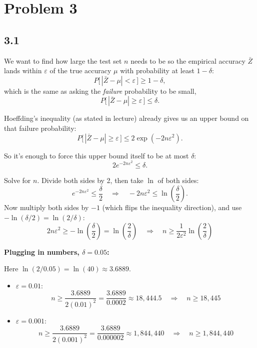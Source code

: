 \documentclass{article}
\begin{document}
\section*{Problem 3}

\subsection*{3.1}

We want to find how large the test set $n$ needs to be so the empirical accuracy $\bar{Z}$ lands within
$\varepsilon$ of the true accuracy $\mu$ with probability at least $1-\delta$:
\[
P\big[\,|\bar Z - \mu| < \varepsilon\,\big] \ge 1-\delta,
\]
which is the same as asking the \emph{failure} probability to be small,
\[
P\big[\,|\bar Z - \mu| \ge \varepsilon\,\big] \le \delta.
\]

\medskip
\noindent
Hoeffding's inequality (as stated in lecture) already gives us an upper bound on that failure probability:
\[
P\big[\,|\bar Z - \mu| \ge \varepsilon\,\big] \le 2\exp(-2n\varepsilon^2).
\]

\medskip
\noindent
So it's enough to force this upper bound itself to be at most $\delta$:
\[
2e^{-2n\varepsilon^2} \le \delta.
\]

\medskip
\noindent
Solve for $n$. Divide both sides by 2, then take $\ln$ of both sides:
\[
e^{-2n\varepsilon^2} \le \frac{\delta}{2}
\quad\Longrightarrow\quad
-2n\varepsilon^2 \le \ln\!\left(\frac{\delta}{2}\right).
\]
Now multiply both sides by $-1$ (which flips the inequality direction), and use
$-\ln(\delta/2) = \ln(2/\delta)$:
\[
2n\varepsilon^2 \ge -\ln\!\left(\frac{\delta}{2}\right) = \ln\!\left(\frac{2}{\delta}\right)
\quad\Longrightarrow\quad
\boxed{n \ge \frac{1}{2\varepsilon^2}\ln\!\left(\frac{2}{\delta}\right)}
\]

\medskip
\noindent
\textbf{Plugging in numbers, $\delta = 0.05$:}

Here $\ln(2/0.05) = \ln(40) \approx 3.6889$.

\begin{itemize}
    \item $\varepsilon = 0.01$:
    \[
    n \ge \frac{3.6889}{2(0.01)^2} = \frac{3.6889}{0.0002} \approx 18{,}444.5
    \quad\Longrightarrow\quad
    \boxed{n \ge 18{,}445}
    \]
    \item $\varepsilon = 0.001$:
    \[
    n \ge \frac{3.6889}{2(0.001)^2} = \frac{3.6889}{0.000002} \approx 1{,}844{,}440
    \quad\Longrightarrow\quad
    \boxed{n \ge 1{,}844{,}440}
    \]
\end{itemize}
\end{document}
